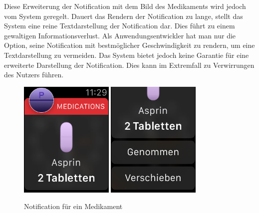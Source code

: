  Diese Erweiterung der Notification mit dem Bild des Medikaments wird jedoch vom System geregelt. Dauert das Rendern der Notification zu lange, stellt das System eine reine Textdarstellung der Notification dar. Dies führt zu einem gewaltigen Informationsverlust. Als Anwendungsentwickler hat man nur die Option, seine Notification mit bestmöglicher Geschwindigkeit zu rendern, um eine Textdarstellung zu vermeiden. Das System bietet jedoch keine Garantie für eine erweiterte Darstellung der Notification. Dies kann im Extremfall zu Verwirrungen des Nutzers führen.
\begin{figure}
	\caption{Notification für ein Medikament}
	\label{fig:watch-app-notification}
	\centering
	\includegraphics[width=0.4\textwidth]{04_realisation/screenshots/watch/notification01.png}
	\includegraphics[width=0.4\textwidth]{04_realisation/screenshots/watch/notification02.png}
\end{figure}

